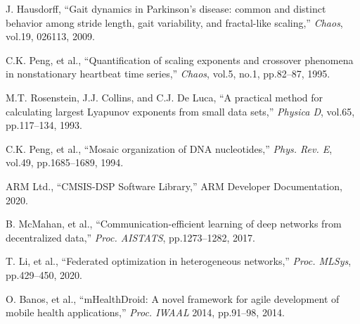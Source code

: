 \documentclass[paper]{ieice}
\begin{document}
\begin{thebibliography}{99}
J. Hausdorff, ``Gait dynamics in Parkinson's disease: common and distinct behavior among stride length, gait variability, and fractal-like scaling,'' \textit{Chaos}, vol.19, 026113, 2009.

C.K. Peng, et al., ``Quantification of scaling exponents and crossover phenomena in nonstationary heartbeat time series,'' \textit{Chaos}, vol.5, no.1, pp.82--87, 1995.

M.T. Rosenstein, J.J. Collins, and C.J. De Luca, ``A practical method for calculating largest Lyapunov exponents from small data sets,'' \textit{Physica D}, vol.65, pp.117--134, 1993.

C.K. Peng, et al., ``Mosaic organization of DNA nucleotides,'' \textit{Phys. Rev. E}, vol.49, pp.1685--1689, 1994.

ARM Ltd., ``CMSIS-DSP Software Library,'' ARM Developer Documentation, 2020.

B. McMahan, et al., ``Communication-efficient learning of deep networks from decentralized data,'' \textit{Proc. AISTATS}, pp.1273--1282, 2017.

T. Li, et al., ``Federated optimization in heterogeneous networks,'' \textit{Proc. MLSys}, pp.429--450, 2020.

O. Banos, et al., ``mHealthDroid: A novel framework for agile development of mobile health applications,'' \textit{Proc. IWAAL} 2014, pp.91--98, 2014.
\end{thebibliography}
\end{document}
